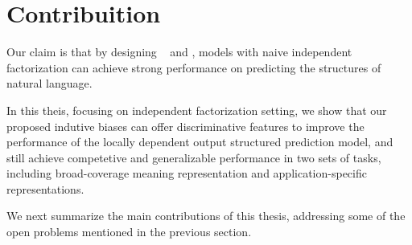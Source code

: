 \section{Contribuition}
\label{sec:intro-contri}

 Our claim is that by designing
~ and , models with naive independent factorization can achieve strong
performance on predicting the structures of natural language.

 In this theis, focusing on independent factorization setting, we show
that our proposed indutive biases can offer discriminative features to
improve the performance of the locally dependent output structured
prediction model, and still achieve competetive and generalizable
performance in two sets of tasks, including broad-coverage meaning
representation and application-specific representations.

We next summarize the main contributions of this thesis, addressing
some of the open problems mentioned in the previous section.

